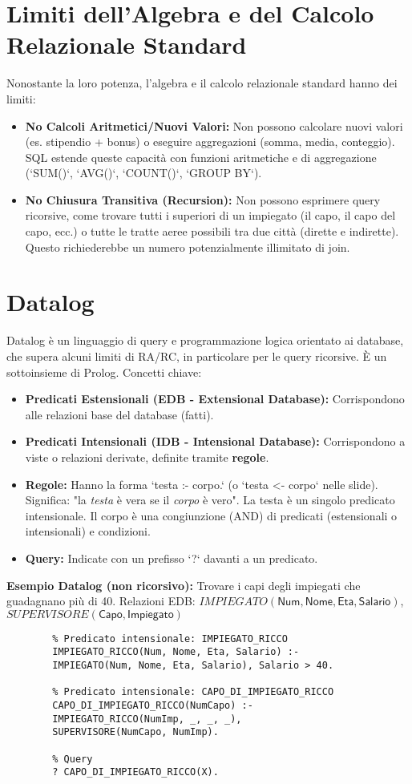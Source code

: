\documentclass{article}
\newcommand{\Rel}[1]{\textit{#1}} %
\newcommand{\Attr}[1]{\textsf{#1}} %
\begin{document}
	\section{Limiti dell'Algebra e del Calcolo Relazionale Standard}
	Nonostante la loro potenza, l'algebra e il calcolo relazionale standard hanno dei limiti:
	\begin{itemize}
		\item \textbf{No Calcoli Aritmetici/Nuovi Valori:} Non possono calcolare nuovi valori (es. stipendio + bonus) o eseguire aggregazioni (somma, media, conteggio). SQL estende queste capacità con funzioni aritmetiche e di aggregazione (`SUM()`, `AVG()`, `COUNT()`, `GROUP BY`).
		\item \textbf{No Chiusura Transitiva (Recursion):} Non possono esprimere query ricorsive, come trovare tutti i superiori di un impiegato (il capo, il capo del capo, ecc.) o tutte le tratte aeree possibili tra due città (dirette e indirette). Questo richiederebbe un numero potenzialmente illimitato di join.
	\end{itemize}
	
	\section{Datalog}
	Datalog è un linguaggio di query e programmazione logica orientato ai database, che supera alcuni limiti di RA/RC, in particolare per le query ricorsive. È un sottoinsieme di Prolog.
	Concetti chiave:
	\begin{itemize}
		\item \textbf{Predicati Estensionali (EDB - Extensional Database):} Corrispondono alle relazioni base del database (fatti).
		\item \textbf{Predicati Intensionali (IDB - Intensional Database):} Corrispondono a viste o relazioni derivate, definite tramite \textbf{regole}.
		\item \textbf{Regole:} Hanno la forma `testa :- corpo.` (o `testa <- corpo` nelle slide).
		Significa: "la \textit{testa} è vera se il \textit{corpo} è vero".
		La testa è un singolo predicato intensionale. Il corpo è una congiunzione (AND) di predicati (estensionali o intensionali) e condizioni.
		\item \textbf{Query:} Indicate con un prefisso `?` davanti a un predicato.
	\end{itemize}
	
	\textbf{Esempio Datalog (non ricorsivo):} Trovare i capi degli impiegati che guadagnano più di 40.
	Relazioni EDB: $\Rel{IMPIEGATO}(\Attr{Num}, \Attr{Nome}, \Attr{Eta}, \Attr{Salario})$, $\Rel{SUPERVISORE}(\Attr{Capo}, \Attr{Impiegato})$
	\begin{verbatim}
		% Predicato intensionale: IMPIEGATO_RICCO
		IMPIEGATO_RICCO(Num, Nome, Eta, Salario) :-
		IMPIEGATO(Num, Nome, Eta, Salario), Salario > 40.
		
		% Predicato intensionale: CAPO_DI_IMPIEGATO_RICCO
		CAPO_DI_IMPIEGATO_RICCO(NumCapo) :-
		IMPIEGATO_RICCO(NumImp, _, _, _),
		SUPERVISORE(NumCapo, NumImp).
		
		% Query
		? CAPO_DI_IMPIEGATO_RICCO(X).
	\end{verbatim}
	
\end{document}
